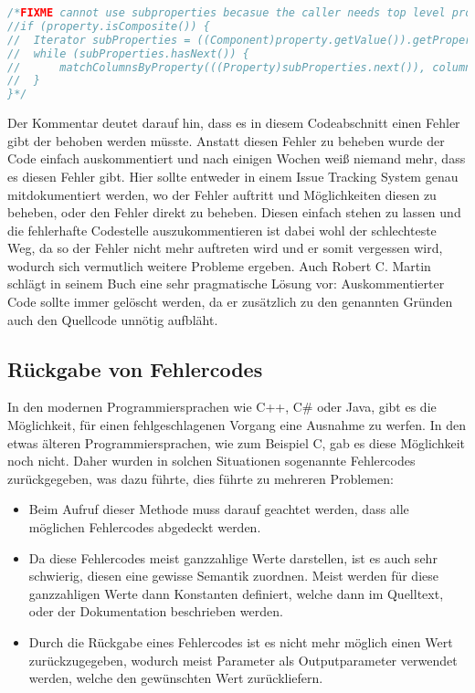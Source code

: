 \begin{lstlisting}[language=Java, caption=Beispiele für auskommentierten Code, label=lst:CommentedCode]
/*FIXME cannot use subproperties becasue the caller needs top level properties
//if (property.isComposite()) {
//	Iterator subProperties = ((Component)property.getValue()).getPropertyIterator();
// 	while (subProperties.hasNext()) {
//  	matchColumnsByProperty(((Property)subProperties.next()), columnsToProperty);
// 	}
}*/ 
\end{lstlisting}

\SuperPar Der Kommentar deutet darauf hin, dass es in diesem Codeabschnitt einen Fehler gibt der behoben werden müsste. Anstatt diesen Fehler zu beheben wurde der Code einfach auskommentiert und nach einigen Wochen weiß niemand mehr, dass es diesen Fehler gibt. Hier sollte entweder in einem Issue Tracking System genau mitdokumentiert werden, wo der Fehler auftritt und Möglichkeiten diesen zu beheben, oder den Fehler direkt zu beheben. Diesen einfach stehen zu lassen und die fehlerhafte Codestelle auszukommentieren ist dabei wohl der schlechteste Weg, da so der Fehler nicht mehr auftreten wird und er somit vergessen wird, wodurch sich vermutlich weitere Probleme ergeben. Auch Robert C. Martin schlägt in seinem Buch eine sehr pragmatische Lösung vor: Auskommentierter Code sollte immer gelöscht werden, da er zusätzlich zu den genannten Gründen auch den Quellcode unnötig aufbläht.

\subsection{Rückgabe von Fehlercodes}

\SuperPar In den modernen Programmiersprachen wie C++, C\# oder Java, gibt es die Möglichkeit, für einen fehlgeschlagenen Vorgang eine Ausnahme zu werfen. In den etwas älteren Programmiersprachen, wie zum Beispiel C, gab es diese Möglichkeit noch nicht. Daher wurden in solchen Situationen sogenannte Fehlercodes zurückgegeben, was dazu führte, dies führte zu mehreren Problemen: 

\begin{itemize}
	\item Beim Aufruf dieser Methode muss darauf geachtet werden, dass alle möglichen Fehlercodes abgedeckt werden. 
	\item Da diese Fehlercodes meist ganzzahlige Werte darstellen, ist es auch sehr schwierig, diesen eine gewisse Semantik zuordnen. Meist werden für diese ganzzahligen Werte dann Konstanten definiert, welche dann im Quelltext, oder der Dokumentation beschrieben werden. 
	\item Durch die Rückgabe eines Fehlercodes ist es nicht mehr möglich einen Wert zurückzugegeben, wodurch meist Parameter als Outputparameter verwendet werden, welche den gewünschten Wert zurückliefern.
\end{itemize}

